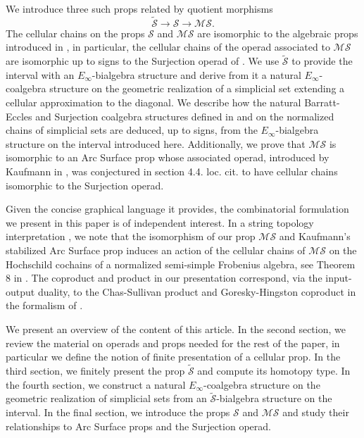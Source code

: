 \documentclass{amsart}
\renewcommand{\S}{\mathcal{S}}
\newcommand{\MS}{\mathcal{MS}}
\renewcommand{\1}{\mathbf{1}}
\theoremstyle{definition}
\begin{document}
We introduce three such props related by quotient morphisms
\begin{equation*}
\tilde{\S} \to \S \to \MS.
\end{equation*}
The cellular chains on the props $\S$ and $\MS$ are isomorphic to the algebraic props introduced in \cite{medina2020prop1}, in particular, the cellular chains of the operad associated to $\MS$ are isomorphic up to signs to the Surjection operad of \cite{mcclure2003multivariable, berger2004combinatorial}. We use $\tilde{\S}$ to provide the interval with an $E_\infty$-bialgebra structure and derive from it a natural $E_\infty$-coalgebra structure on the geometric realization of a simplicial set extending a cellular approximation to the diagonal. We describe how the natural Barratt-Eccles and Surjection coalgebra structures defined in \cite{berger2004combinatorial} and \cite{mcclure2003multivariable} on the normalized chains of simplicial sets are deduced, up to signs, from the $E_\infty$-bialgebra structure on the interval introduced here. Additionally, we prove that $\MS$ is isomorphic to an Arc Surface prop \cite{kaufmann03arc} whose associated operad, introduced by Kaufmann in \cite{kaufmann09dimension}, was conjectured in section 4.4. loc. cit. to have cellular chains isomorphic to the Surjection operad.

Given the concise graphical language it provides, the combinatorial formulation we present in this paper is of independent interest. In a string topology interpretation \cite{tradler07string, kaufmann08frobenious}, we note that the isomorphism of our prop $\MS$ and Kaufmann's stabilized Arc Surface prop induces an action of the cellular chains of $\MS$ on the Hochschild cochains of a normalized semi-simple Frobenius algebra, see Theorem 8 in \cite{kaufmann2008noncommutative}. The coproduct and product in our presentation correspond, via the input-output duality, to the Chas-Sullivan product \cite{chas1999string} and Goresky-Hingston coproduct \cite{goresky09loop} in the formalism of \cite{kaufmann2018detailed}.

We present an overview of the content of this article. In the second section, we review the material on operads and props needed for the rest of the paper, in particular we define the notion of finite presentation of a cellular prop. In the third section, we finitely present the prop $\tilde{\S}$ and compute its homotopy type. In the fourth section, we construct a natural $E_\infty$-coalgebra structure on the geometric realization of simplicial sets from an $\tilde{\S}$-bialgebra structure on the interval. In the final section, we introduce the props $\S$ and $\MS$ and study their relationships to Arc Surface props and the Surjection operad.
\end{document}
